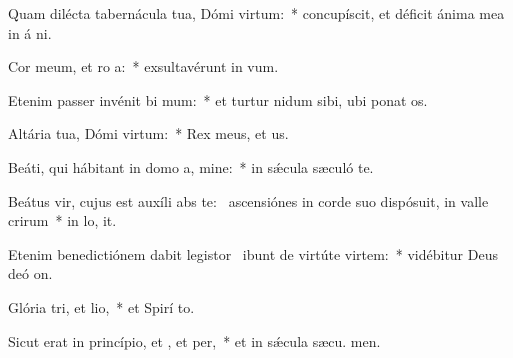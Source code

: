 \item Quam dilécta tabernácula tua, Dómi virtum:~* concupíscit, et déficit ánima mea in á ni.
\item Cor meum, et ro a:~* exsultavérunt in  vum.
\item Etenim passer invénit bi mum:~* et turtur nidum sibi, ubi ponat  os.
\item Altária tua, Dómi virtum:~* Rex meus, et  us.
\item Beáti, qui hábitant in domo a, mine:~* in sǽcula sæculó  te.
\item Beátus vir, cujus est auxíli abs te:~\pscross{} ascensiónes in corde suo dispósuit, in valle crirum~* in lo,  it.
\item Etenim benedictiónem dabit legistor~\pscross{} ibunt de virtúte  virtem:~* vidébitur Deus deó  on.
\item Glória tri, et lio,~* et Spirí to.
\item Sicut erat in princípio, et , et per,~* et in sǽcula sæcu. men.
